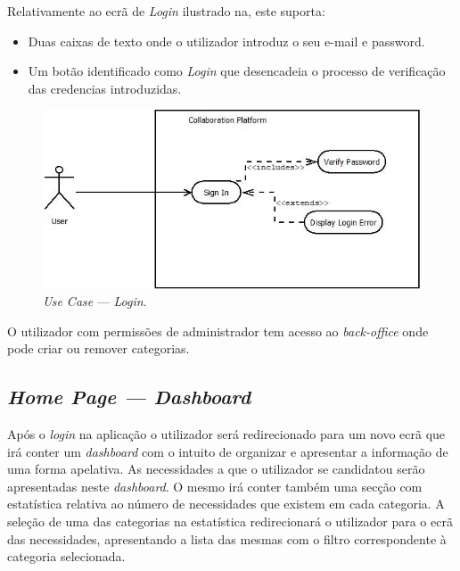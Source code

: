 Relativamente ao ecrã de \textit{Login} ilustrado na, este suporta:

\begin{itemize}
    \item Duas caixas de texto onde o utilizador introduz o seu e-mail e password.
    \item Um botão identificado como \textit{Login} que desencadeia o processo de verificação das credencias introduzidas.
\end{itemize}

\begin{figure}[H]
    \centering
    \includegraphics[scale=0.6]{figures/Login Use Case.jpeg}
    \caption{\textit{Use Case} --- \textit{Login}.}\label{fig:uc:login}
\end{figure}

O utilizador com permissões de administrador tem acesso ao \textit{back-office} onde pode criar ou remover categorias.

\subsection{\textit{Home Page --- Dashboard}}\label{subsec:dashboard}

Após o \textit{login} na aplicação o utilizador será redirecionado para um novo ecrã que irá conter um \textit{dashboard} com o intuito de organizar e 
apresentar a informação de uma forma apelativa. As necessidades a que o utilizador se candidatou serão apresentadas neste \textit{dashboard}. 
O mesmo irá conter também uma secção com estatística relativa ao número de necessidades que existem em cada categoria. 
A seleção de uma das categorias na estatística redirecionará o utilizador para o ecrã das necessidades, 
apresentando a lista das mesmas com o filtro correspondente à categoria selecionada. 

